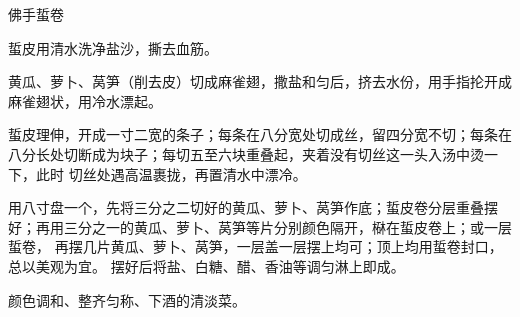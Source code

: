 %
%
%
%
%
%
%
\begin{recipe}{佛手蜇卷}

\ingredients


\preparation

\step 蜇皮用清水洗净盐沙，撕去血筋。

\step 黄瓜、萝卜、莴笋（削去皮）切成麻雀翅，撒盐和匀后，挤去水份，用手指抡开成
麻雀翅状，用冷水漂起。

\step 蜇皮理伸，开成一寸二宽的条子；每条在八分宽处切成丝，留四分宽不切；每条在
八分长处切断成为块子；每切五至六块重叠起，夹着没有切丝这一头入汤中烫一下，此时
切丝处遇高温裹拢，再置清水中漂冷。

\step 用八寸盘一个，先将三分之二切好的黄瓜、萝卜、莴笋作底；蜇皮卷分层重叠摆
好；再用三分之一的黄瓜、萝卜、莴笋等片分别颜色隔开，㮟在蜇皮卷上；或一层蜇卷，
再摆几片黄瓜、萝卜、莴笋，一层盖一层摆上均可；顶上均用蜇卷封口，总以美观为宜。
摆好后将盐、白糖、醋、香油等调匀淋上即成。

\features

颜色调和、整齐匀称、下酒的清淡菜。

\end{recipe}

